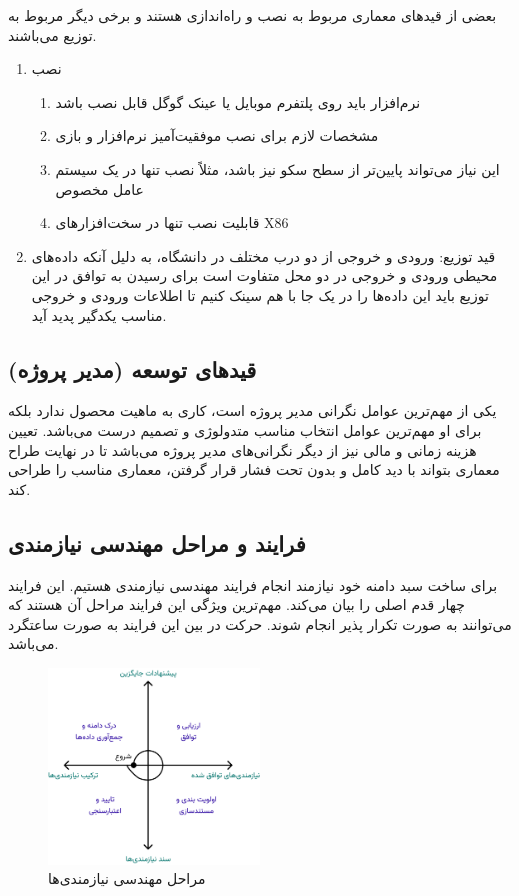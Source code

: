 بعضی از قید‌های معماری مربوط به نصب و راه‌اندازی هستند و برخی دیگر مربوط به
توزیع می‌باشند.

\begin{enumerate}
    \item نصب
    \begin{enumerate}
        \item نرم‌افزار باید روی پلتفرم موبایل یا عینک گوگل قابل نصب باشد
        \item مشخصات لازم برای نصب موفقیت‌آمیز نرم‌افزار و بازی
        \item این نیاز می‌تواند پایین‌تر از سطح سکو نیز باشد، مثلاً نصب تنها در
        یک سیستم عامل مخصوص
        \item قابلیت نصب تنها در سخت‌افزار‌های X86
    \end{enumerate}
    \item قید توزیع: ورودی و خروجی از دو درب مختلف در دانشگاه، به دلیل آنکه
    داده‌های محیطی ورودی و خروجی در دو محل متفاوت است برای رسیدن به توافق در این
    توزیع باید این داده‌ها را در یک جا با هم سینک کنیم تا اطلاعات ورودی و خروجی
    مناسب یکدگیر پدید آید.
\end{enumerate}

\subsection{قید‌های توسعه  (مدیر پروژه)}

یکی از مهم‌ترین عوامل نگرانی مدیر پروژه است، کاری به ماهیت محصول ندارد بلکه برای
او مهم‌ترین عوامل انتخاب مناسب متدولوژی و تصمیم درست می‌باشد. تعیین هزینه زمانی
و مالی نیز از دیگر نگرانی‌های مدیر پروژه می‌باشد تا در نهایت طراح معماری بتواند
با دید کامل و بدون تحت فشار قرار گرفتن، معماری مناسب را طراحی کند.

\subsection{فرایند و مراحل مهندسی نیازمندی‌}

برای ساخت سبد دامنه خود نیازمند انجام فرایند مهندسی نیازمندی هستیم. این فرایند
چهار قدم اصلی را بیان می‌کند. مهم‌ترین ویژگی این فرایند مراحل آن هستند که
می‌توانند به صورت تکرار پذیر انجام شوند. حرکت در بین این فرایند به صورت ساعتگرد
می‌باشد.

\begin{figure}[H]
    \centering
    \includegraphics[width=0.5\textwidth]{images/re_process.png}
    \caption{مراحل مهندسی نیازمندی‌ها}
    \label{fig: reProcess}
\end{figure}


